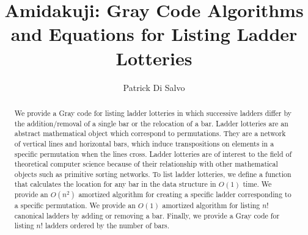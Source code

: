 \documentclass[11pt,dvipsnames]{gthesis}
\begin{document}
\title{Amidakuji: Gray Code Algorithms and Equations for Listing Ladder Lotteries}

\author{Patrick Di Salvo}







\maketitle




\begin{frontmatter}

\begin{abstract}

We provide a Gray code for listing ladder lotteries in which successive ladders differ by the addition/removal of a single bar or 
the relocation of a bar. Ladder lotteries are an abstract mathematical object which correspond to permutations. They are a network of vertical lines 
and horizontal bars, which induce transpositions on elements in a specific permutation when the lines cross. 
Ladder lotteries are of interest to the field of theoretical computer science because of their relationship with other 
mathematical objects such as primitive sorting networks. 
To list ladder lotteries, we define a function that calculates the location for any bar in the data structure in $O(1)$ time. We provide an $O(n^2)$ amortized 
algorithm for creating a specific ladder corresponding to a specific permutation. We provide an $O(1)$ amortized algorithm for listing 
 $n!$ canonical ladders by adding or removing a bar. Finally, we provide a Gray code for listing $n!$ ladders ordered by 
 the number of bars. 

\medskip

\small
\centering

\end{abstract}
\end{frontmatter}
\end{document}
